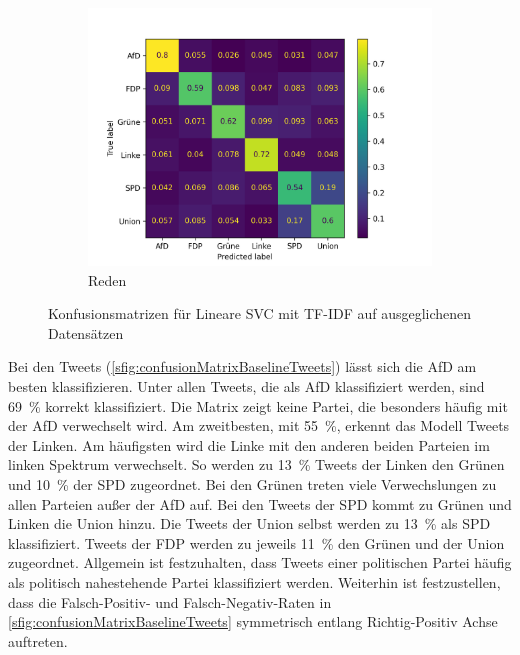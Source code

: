 \begin{figure}[H]
\begin{subfigure}{0.49\textwidth}
    \includegraphics[width=\textwidth]{data/images/modeling/baseline/under/speeches_confusion_matrix.png}
    \caption{Reden}
    \label{sfig:confusionMatrixBaselineSpeeches}
  \end{subfigure}
  \caption{Konfusionsmatrizen für Lineare \acs{SVC} mit \acs{TF-IDF} auf ausgeglichenen Datensätzen} \label{fig:confusionMatrixBaseline}
\end{figure}

Bei den Tweets (\autoref{sfig:confusionMatrixBaselineTweets}) lässt sich die \ac{AfD} am besten klassifizieren. Unter allen Tweets, die als \ac{AfD} klassifiziert werden, sind \SI{69}{\percent} korrekt klassifiziert. Die Matrix zeigt keine Partei, die besonders häufig mit der \ac{AfD} verwechselt wird. Am zweitbesten, mit \SI{55}{\percent}, erkennt das Modell Tweets der Linken. Am häufigsten wird die Linke mit den anderen beiden Parteien im linken Spektrum verwechselt. So werden zu \SI{13}{\percent} Tweets der Linken den Grünen und \SI{10}{\percent} der \ac{SPD} zugeordnet. Bei den Grünen treten viele Verwechslungen zu allen Parteien außer der \ac{AfD} auf. Bei den Tweets der \ac{SPD} kommt zu Grünen und Linken die Union hinzu. Die Tweets der Union selbst werden zu \SI{13}{\percent} als \ac{SPD} klassifiziert. Tweets der \ac{FDP} werden zu jeweils \SI{11}{\percent} den Grünen und der Union zugeordnet. Allgemein ist festzuhalten, dass Tweets einer politischen Partei häufig als politisch nahestehende Partei klassifiziert werden. Weiterhin ist festzustellen, dass die Falsch-Positiv- und Falsch-Negativ-Raten in \autoref{sfig:confusionMatrixBaselineTweets} symmetrisch entlang Richtig-Positiv Achse auftreten.

